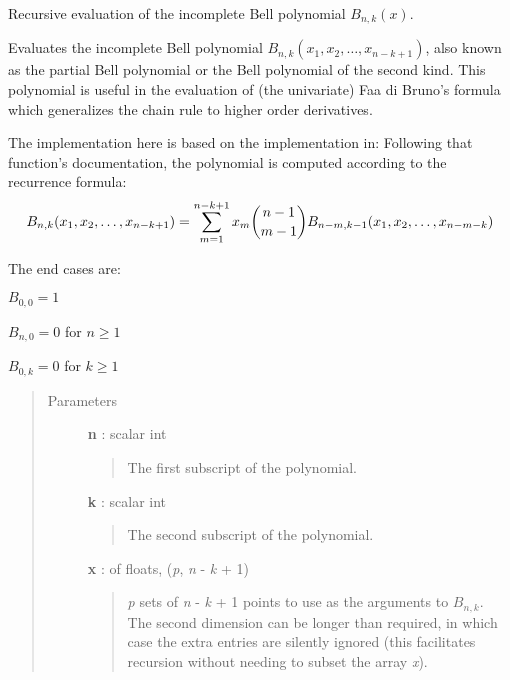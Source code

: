 \documentclass[letterpaper,10pt,english]{sphinxmanual}
\begin{document}
\begin{fulllineitems}
\label{gptools:gptools.utils.incomplete_bell_poly}
Recursive evaluation of the incomplete Bell polynomial $B_{n, k}(x)$.

Evaluates the incomplete Bell polynomial $B_{n, k}(x_1, x_2, \dots, x_{n-k+1})$,
also known as the partial Bell polynomial or the Bell polynomial of the
second kind. This polynomial is useful in the evaluation of (the univariate)
Faa di Bruno's formula which generalizes the chain rule to higher order
derivatives.

The implementation here is based on the implementation in:
Following that function's documentation, the polynomial is computed
according to the recurrence formula:
\begin{gather}
\begin{split}B_{n, k}(x_1, x_2, \dots, x_{n-k+1}) = \sum_{m=1}^{n-k+1}x_m\binom{n-1}{m-1}B_{n-m, k-1}(x_1, x_2, \dots, x_{n-m-k})\end{split}\notag
\end{gather}
\begin{DUlineblock}{0em}
\item[] The end cases are:
\item[] $B_{0, 0} = 1$
\item[] $B_{n, 0} = 0$ for $n \ge 1$
\item[] $B_{0, k} = 0$ for $k \ge 1$
\end{DUlineblock}
\begin{quote}\begin{description}
\item[{Parameters }] \leavevmode
\textbf{n} : scalar int
\begin{quote}

The first subscript of the polynomial.
\end{quote}

\textbf{k} : scalar int
\begin{quote}

The second subscript of the polynomial.
\end{quote}

\textbf{x} :  of floats, (\emph{p}, \emph{n} - \emph{k} + 1)
\begin{quote}

\emph{p} sets of \emph{n} - \emph{k} + 1 points to use as the arguments to
$B_{n,k}$. The second dimension can be longer than
required, in which case the extra entries are silently ignored
(this facilitates recursion without needing to subset the array \emph{x}).
\end{quote}


\end{description}
\end{quote}
\end{fulllineitems}
\end{document}
